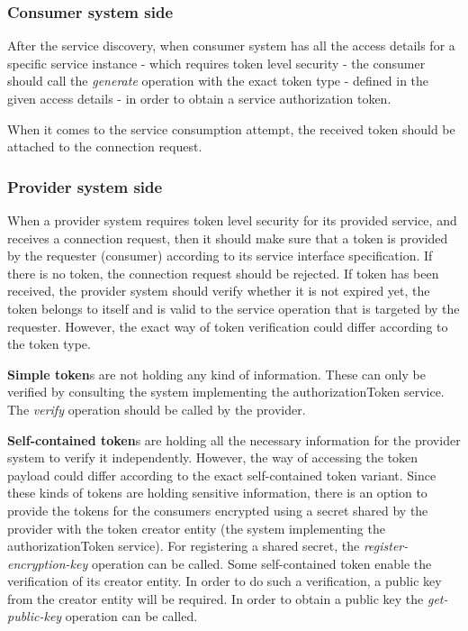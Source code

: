 \documentclass[a4paper]{arrowhead}
\begin{document}
\subsubsection{Consumer system side} 

After the service discovery, when consumer system has all the access details for a specific service instance  - which requires token level security - the consumer should call the \textit{generate} operation with the exact token type - defined in the given access details - in order to obtain a service authorization token. 

When it comes to the service consumption attempt, the received token should be attached to the connection request. 

\subsubsection{Provider system side}

When a provider system requires token level security for its provided service, and receives a connection request, then it should make sure that a token is provided by the requester (consumer) according to its service interface specification. If there is no token, the connection request should be rejected. If token has been received, the provider system should verify whether it is not expired yet, the token belongs to itself and is valid to the service operation that is targeted by the requester. However, the exact way of token verification could differ according to the token type.

\textbf{Simple token}s are not holding any kind of information. These can only be verified by consulting the system implementing the authorizationToken service. The \textit{verify} operation should be called by the provider.

\textbf{Self-contained token}s are holding all the necessary information for the provider system to verify it independently. However, the way of accessing the token payload could differ according to the exact self-contained token variant. Since these kinds of tokens are holding sensitive information, there is an option to provide the tokens for the consumers encrypted using a secret shared by the provider with the token creator entity (the system implementing the authorizationToken service). For registering a shared secret, the \textit{register-encryption-key} operation can be called. Some self-contained token enable the verification of its creator entity. In order to do such a verification, a public key from the creator entity will be required. In order to obtain a public key the \textit{get-public-key} operation can be called.
\end{document}
